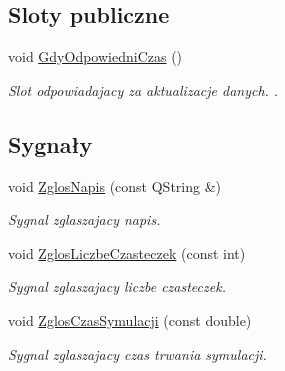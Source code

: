 \subsection*{Sloty publiczne}
\begin{DoxyCompactItemize}
\item 
void \hyperlink{class_zbiornik_aa07ceb0fcbf307f0aa1eb75c32f3f47e}{Gdy\+Odpowiedni\+Czas} ()
\begin{DoxyCompactList}\small\item\em Slot odpowiadajacy za aktualizacje danych. . \end{DoxyCompactList}\end{DoxyCompactItemize}
\subsection*{Sygnały}
\begin{DoxyCompactItemize}
\item 
void \hyperlink{class_zbiornik_a2d92e4a46f9a5dda37ddd9948046580b}{Zglos\+Napis} (const Q\+String \&)
\begin{DoxyCompactList}\small\item\em Sygnal zglaszajacy napis. \end{DoxyCompactList}\item 
void \hyperlink{class_zbiornik_ad200a7e5bc038ad94131d1a354266889}{Zglos\+Liczbe\+Czasteczek} (const int)
\begin{DoxyCompactList}\small\item\em Sygnal zglaszajacy liczbe czasteczek. \end{DoxyCompactList}\item 
void \hyperlink{class_zbiornik_a96b9ee7d80fc0f29787dc060027d2805}{Zglos\+Czas\+Symulacji} (const double)
\begin{DoxyCompactList}\small\item\em Sygnal zglaszajacy czas trwania symulacji. \end{DoxyCompactList}\end{DoxyCompactItemize}
